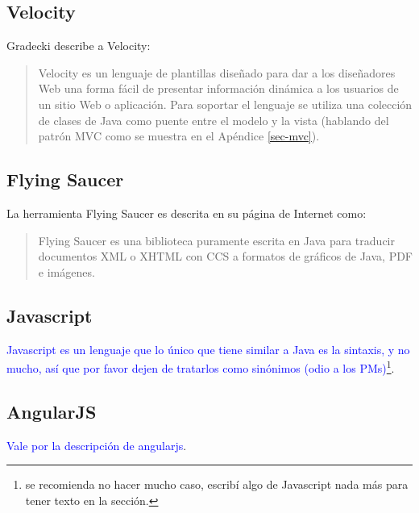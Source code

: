 \subsection{Velocity}\label{sec-velocity}
Gradecki\cite{MasteringApacheVelocity} describe a Velocity:

\begin{quote}
	Velocity es un lenguaje de plantillas diseñado para dar a los diseñadores Web una forma fácil de presentar información dinámica a los usuarios de un sitio Web o aplicación. Para soportar el lenguaje se utiliza una colección de clases de Java como puente entre el modelo y la vista (hablando del patrón MVC como se muestra en el Apéndice \ref{sec-mvc}).
\end{quote}

\subsection{Flying Saucer}\label{sec-flying-saucer}
La herramienta Flying Saucer es descrita en su página de Internet\cite{FlyingSaucer} como:
\begin{quote}
	Flying Saucer es una biblioteca puramente escrita en Java para traducir documentos XML o XHTML con CCS a formatos de gráficos de Java, PDF e imágenes.
\end{quote}


\subsection{Javascript}\label{sec-javascript}
\textcolor{blue}{Javascript es un lenguaje que lo único que tiene similar a Java es la sintaxis, y no mucho, así que por favor dejen de tratarlos como sinónimos (odio a los PMs)}\footnote{se recomienda no hacer mucho caso, escribí algo de Javascript nada más para tener texto en la sección.}.

\subsection{AngularJS}\label{sec-angularjs}
\textcolor{blue}{Vale por la descripción de angularjs}.

